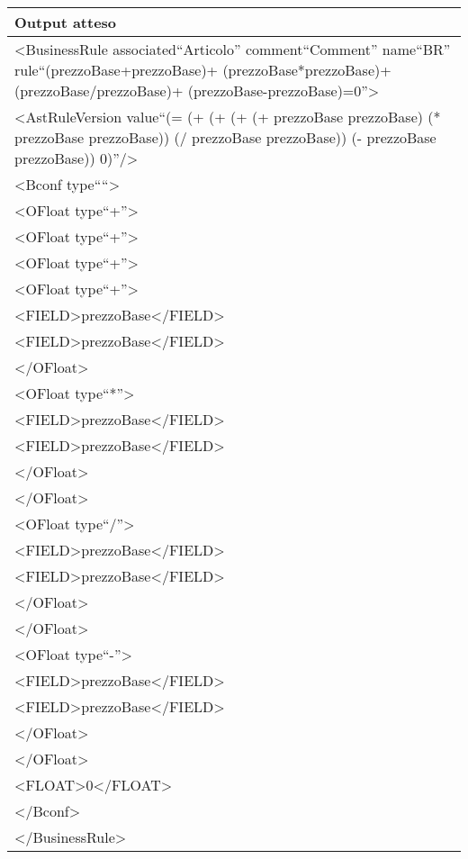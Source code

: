 \begin{center}
\begin{tabular}{|p{11cm}|} \hline
\textbf{Output atteso}\\ \hline
\textless BusinessRule associated``Articolo'' comment``Comment'' name``BR'' rule``(prezzoBase+prezzoBase)+ (prezzoBase*prezzoBase)+ (prezzoBase/prezzoBase)+ (prezzoBase-prezzoBase)=0''\textgreater\\
\textless AstRuleVersion value``(= (+ (+ (+ (+ prezzoBase prezzoBase) (* prezzoBase prezzoBase)) (/ prezzoBase prezzoBase)) (- prezzoBase prezzoBase)) 0)''/\textgreater\\
\textless Bconf type````\textgreater\\
\textless OFloat type``+''\textgreater\\
\textless OFloat type``+''\textgreater\\
\textless OFloat type``+''\textgreater\\
\textless OFloat type``+''\textgreater\\
\textless FIELD\textgreater prezzoBase\textless /FIELD\textgreater\\
\textless FIELD\textgreater prezzoBase\textless /FIELD\textgreater\\
\textless /OFloat\textgreater\\
\textless OFloat type``*''\textgreater\\
\textless FIELD\textgreater prezzoBase\textless /FIELD\textgreater\\
\textless FIELD\textgreater prezzoBase\textless /FIELD\textgreater\\
\textless /OFloat\textgreater\\
\textless /OFloat\textgreater\\
\textless OFloat type``/''\textgreater\\
\textless FIELD\textgreater prezzoBase\textless /FIELD\textgreater\\
\textless FIELD\textgreater prezzoBase\textless /FIELD\textgreater\\
\textless /OFloat\textgreater\\
\textless /OFloat\textgreater\\
\textless OFloat type``-''\textgreater\\
\textless FIELD\textgreater prezzoBase\textless /FIELD\textgreater\\
\textless FIELD\textgreater prezzoBase\textless /FIELD\textgreater\\
\textless /OFloat\textgreater\\
\textless /OFloat\textgreater\\
\textless FLOAT\textgreater0\textless /FLOAT\textgreater\\
\textless /Bconf\textgreater\\
\textless /BusinessRule\textgreater\\
 \hline
\end{tabular} \\
\end{center}

